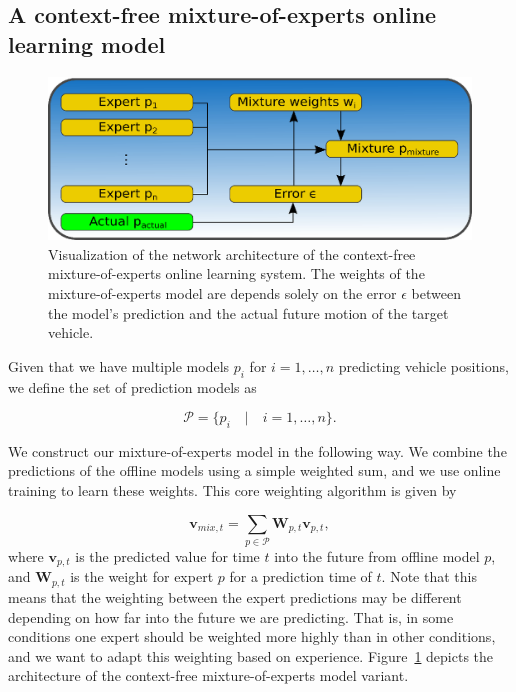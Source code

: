 \subsection{A context-free mixture-of-experts online learning model}%
\label{subsec:a_context_free_mixture_of_experts_online_learning_model}
\begin{figure}[t]
    \centering
    \includegraphics[width=0.8\linewidth]{imgs/mix_context_free_system_arch.eps}
    \caption{Visualization of the network architecture of the context-free mixture-of-experts online learning system.
    The weights of the mixture-of-experts model are depends solely on the error $\epsilon$ between the model's prediction and the actual future motion of the target vehicle.}
    \label{fig:mix_context_free_system_arch}
\end{figure}
Given that we have multiple models $ p_{i}$ for $i=1, \ldots, n$ predicting vehicle positions, we define the set of prediction models as 

\begin{equation}
\label{eq:mix_pred_model_set}
\mathcal{P} = \{ p_{i}  \quad | \quad i=1, \ldots, n \}.
\end{equation}

We construct our mixture-of-experts model in the following way.
We combine the predictions of the offline models using a simple weighted sum, and we use online training to learn these weights.
This core weighting algorithm is given by 

\begin{equation}
\label{eq:mix_weighting}
\mathbf{v}_{mix,t} = \sum\limits_{ p \in \mathcal{P}} \mathbf{W}_{ p ,t} \mathbf{v}_{ p ,t},
\end{equation}
where $\mathbf{v}_{ p ,t}$ is the predicted value for time $t$ into the future from offline model $p$, and $\mathbf{W}_{ p ,t}$ is the weight for expert $p$ for a prediction time of $t$.
Note that this means that the weighting between the expert predictions may be different depending on how far into the future we are predicting.
That is, in some conditions one expert should be weighted more highly than in other conditions, and we want to adapt this weighting based on experience.
Figure~\ref{fig:mix_context_free_system_arch} depicts the architecture of the context-free mixture-of-experts model variant.

